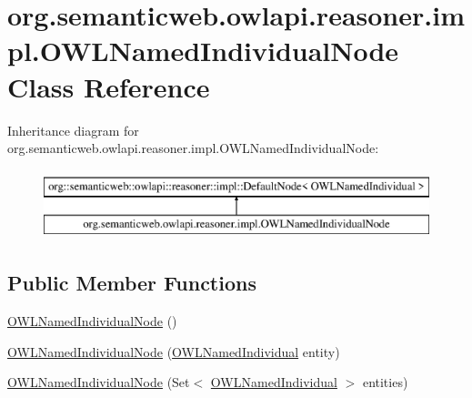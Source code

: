 \hypertarget{classorg_1_1semanticweb_1_1owlapi_1_1reasoner_1_1impl_1_1_o_w_l_named_individual_node}{\section{org.\-semanticweb.\-owlapi.\-reasoner.\-impl.\-O\-W\-L\-Named\-Individual\-Node Class Reference}
\label{classorg_1_1semanticweb_1_1owlapi_1_1reasoner_1_1impl_1_1_o_w_l_named_individual_node}
}
Inheritance diagram for org.\-semanticweb.\-owlapi.\-reasoner.\-impl.\-O\-W\-L\-Named\-Individual\-Node\-:\begin{figure}[H]
\begin{center}
\leavevmode
\includegraphics[height=2.000000cm]{classorg_1_1semanticweb_1_1owlapi_1_1reasoner_1_1impl_1_1_o_w_l_named_individual_node}
\end{center}
\end{figure}
\subsection*{Public Member Functions}
\begin{DoxyCompactItemize}
\item 
\hyperlink{classorg_1_1semanticweb_1_1owlapi_1_1reasoner_1_1impl_1_1_o_w_l_named_individual_node_a252960931727e84ae667b26d92229b0f}{O\-W\-L\-Named\-Individual\-Node} ()
\item 
\hyperlink{classorg_1_1semanticweb_1_1owlapi_1_1reasoner_1_1impl_1_1_o_w_l_named_individual_node_aa7d378c23271697eea592b669763ea09}{O\-W\-L\-Named\-Individual\-Node} (\hyperlink{interfaceorg_1_1semanticweb_1_1owlapi_1_1model_1_1_o_w_l_named_individual}{O\-W\-L\-Named\-Individual} entity)
\item 
\hyperlink{classorg_1_1semanticweb_1_1owlapi_1_1reasoner_1_1impl_1_1_o_w_l_named_individual_node_abe95413ea15e02333e3af203d79a8422}{O\-W\-L\-Named\-Individual\-Node} (Set$<$ \hyperlink{interfaceorg_1_1semanticweb_1_1owlapi_1_1model_1_1_o_w_l_named_individual}{O\-W\-L\-Named\-Individual} $>$ entities)
\end{DoxyCompactItemize}
